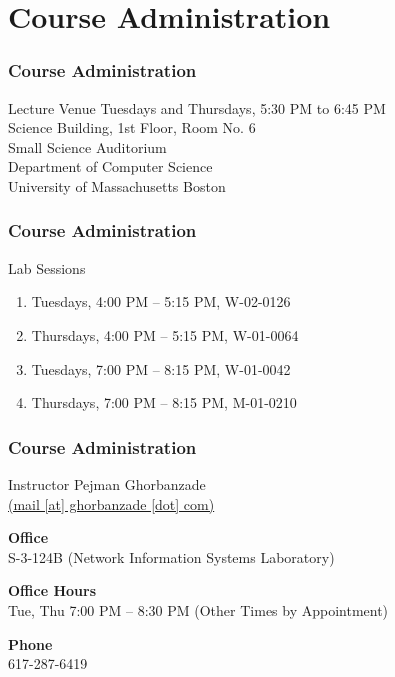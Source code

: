\documentclass[10pt, compress]{beamer}
\begin{document}
\prepareCover

\section{Course Administration}

\begin{frame}[fragile]
	\frametitle{Course Administration}
	\begin{block}{Lecture Venue}
		Tuesdays and Thursdays, 5:30 PM to 6:45 PM\\
		Science Building, 1st Floor, Room No. 6\\
		Small Science Auditorium\\
		Department of Computer Science\\
		University of Massachusetts Boston
	\end{block}
\end{frame}

\begin{frame}[fragile]
	\frametitle{Course Administration}
	\begin{block}{Lab Sessions}
		\begin{enumerate}
			\item Tuesdays, 4:00 PM -- 5:15 PM, W-02-0126
			\item Thursdays, 4:00 PM -- 5:15 PM, W-01-0064
			\item Tuesdays, 7:00 PM -- 8:15 PM, W-01-0042
			\item Thursdays, 7:00 PM -- 8:15 PM, M-01-0210
		\end{enumerate}
	\end{block}
\end{frame}

\begin{frame}[fragile]
	\frametitle{Course Administration}
	\begin{block}{Instructor}
		Pejman Ghorbanzade\\\href{mailto:mail@ghorbanzade.com}{(mail [at] ghorbanzade [dot] com)}

		\textbf{Office}\\S-3-124B (Network Information Systems Laboratory)

		\textbf{Office Hours}\\Tue, Thu 7:00 PM -- 8:30 PM (Other Times by Appointment)

		\textbf{Phone}\\617-287-6419
	\end{block}
\end{frame}
\end{document}
